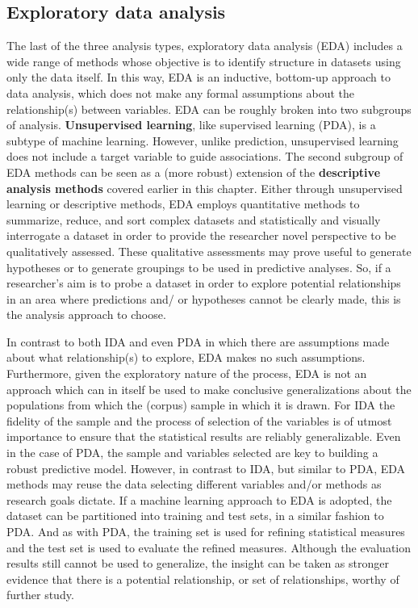 \documentclass[
  letterpaper,
]{latex/krantz}
\begin{document}
\hypertarget{exploratory-data-analysis}{%
\subsection{Exploratory data analysis}\label{exploratory-data-analysis}}

The last of the three analysis types, exploratory data analysis (EDA)
includes a wide range of methods whose objective is to identify
structure in datasets using only the data itself. In this way, EDA is an
inductive, bottom-up approach to data analysis, which does not make any
formal assumptions about the relationship(s) between variables. EDA can
be roughly broken into two subgroups of analysis. \textbf{Unsupervised
learning}, like supervised learning (PDA), is a subtype of machine
learning. However, unlike prediction, unsupervised learning does not
include a target variable to guide associations. The second subgroup of
EDA methods can be seen as a (more robust) extension of the
\textbf{descriptive analysis methods} covered earlier in this chapter.
Either through unsupervised learning or descriptive methods, EDA employs
quantitative methods to summarize, reduce, and sort complex datasets and
statistically and visually interrogate a dataset in order to provide the
researcher novel perspective to be qualitatively assessed. These
qualitative assessments may prove useful to generate hypotheses or to
generate groupings to be used in predictive analyses. So, if a
researcher's aim is to probe a dataset in order to explore potential
relationships in an area where predictions and/ or hypotheses cannot be
clearly made, this is the analysis approach to choose.

In contrast to both IDA and even PDA in which there are assumptions made
about what relationship(s) to explore, EDA makes no such assumptions.
Furthermore, given the exploratory nature of the process, EDA is not an
approach which can in itself be used to make conclusive generalizations
about the populations from which the (corpus) sample in which it is
drawn. For IDA the fidelity of the sample and the process of selection
of the variables is of utmost importance to ensure that the statistical
results are reliably generalizable. Even in the case of PDA, the sample
and variables selected are key to building a robust predictive model.
However, in contrast to IDA, but similar to PDA, EDA methods may reuse
the data selecting different variables and/or methods as research goals
dictate. If a machine learning approach to EDA is adopted, the dataset
can be partitioned into training and test sets, in a similar fashion to
PDA. And as with PDA, the training set is used for refining statistical
measures and the test set is used to evaluate the refined measures.
Although the evaluation results still cannot be used to generalize, the
insight can be taken as stronger evidence that there is a potential
relationship, or set of relationships, worthy of further study.
\end{document}
